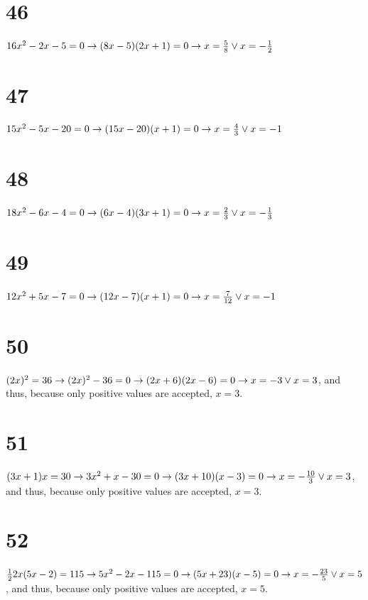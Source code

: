 \documentclass{article}
\theoremstyle{definition}
\begin{document}
\section*{46}
$16x^2-2x-5=0\newline\rightarrow (8x-5)(2x+1)=0\newline\rightarrow x=\frac{5}{8}\vee x=-\frac{1}{2}$

\section*{47}
$15x^2-5x-20=0\newline\rightarrow (15x-20)(x+1)=0\newline\rightarrow x=\frac{4}{3}\vee x=-1$

\section*{48}
$18x^2-6x-4=0\newline\rightarrow (6x-4)(3x+1)=0\newline\rightarrow x=\frac{2}{3}\vee x=-\frac{1}{3}$

\section*{49}
$12x^2+5x-7=0\newline\rightarrow (12x-7)(x+1)=0\newline\rightarrow x=\frac{7}{12}\vee x=-1$

\section*{50}
$(2x)^2=36\newline\rightarrow (2x)^2-36=0\newline\rightarrow (2x+6)(2x-6)=0\newline\rightarrow x=-3\vee x=3$, and thus, because only 
positive values are accepted, $x=3$.

\section*{51}
$(3x+1)x=30\newline\rightarrow 3x^2+x-30=0\newline\rightarrow (3x+10)(x-3)=0\newline\rightarrow x=-\frac{10}{3}\vee x=3$, and thus, because only positive 
values are accepted, $x=3$.

\section*{52}
$\frac{1}{2}2x(5x-2)=115\newline\rightarrow 5x^2-2x-115=0\newline\rightarrow (5x+23)(x-5)=0\newline\rightarrow x=-\frac{23}{5}\vee x=5$, and thus, 
because only positive values are accepted, $x=5$. 
\end{document}
